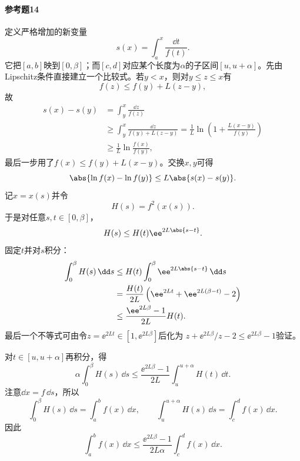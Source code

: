 \paragraph{参考题14}
\begin{xsolution}
定义严格增加的新变量
\[
 s(x)=\int_a^x\frac{\dd t}{f(t)}.
\]
它把$[a,b]$映到$[0,\beta]$；而$[c,d]$对应某个长度为$\alpha$的子区间$[u,u+\alpha]$。先由Lipschitz条件直接建立一个比较式。若$y<x$，则对$y\le z\le x$有
\[
 f(z)\le f(y)+L(z-y),
\]
故
\begin{align*}
 s(x)-s(y)
 &=\int_y^x\frac{\dd z}{f(z)}\\
 &\ge\int_y^x\frac{\dd z}{f(y)+L(z-y)}
 =\frac1L\ln\left(1+\frac{L(x-y)}{f(y)}\right)\\
 &\ge\frac1L\ln\frac{f(x)}{f(y)},
\end{align*}
最后一步用了$f(x)\le f(y)+L(x-y)$。交换$x,y$可得
\[
 \abs{\ln f(x)-\ln f(y)}\le L\abs{s(x)-s(y)}.
\]
记$x=x(s)$并令
\[
 H(s)=f^2(x(s)).
\]
于是对任意$s,t\in[0,\beta]$，
\[
 H(s)\le H(t)\ee^{2L\abs{s-t}}.
\]
固定$t$并对$s$积分：
\begin{align*}
\int_0^\beta H(s)\,\dd s
&\le H(t)\int_0^\beta\ee^{2L\abs{s-t}}\,\dd s\\
&=\frac{H(t)}{2L}\left(
 \ee^{2Lt}+\ee^{2L(\beta-t)}-2
\right)\\
&\le\frac{\ee^{2L\beta}-1}{2L}H(t).
\end{align*}
最后一个不等式可由令$z=\ee^{2Lt}\in[1,\ee^{2L\beta}]$后化为
$z+\ee^{2L\beta}/z-2\le\ee^{2L\beta}-1$验证。

对$t\in[u,u+\alpha]$再积分，得
\[
 \alpha\int_0^\beta H(s)\,\dd s
 \le\frac{\ee^{2L\beta}-1}{2L}
 \int_u^{u+\alpha}H(t)\,\dd t.
\]
注意$\dd x=f\,\dd s$，所以
\[
 \int_0^\beta H(s)\,\dd s=\int_a^bf(x)\,\dd x,
 \qquad
 \int_u^{u+\alpha}H(s)\,\dd s=\int_c^df(x)\,\dd x.
\]
因此
\[
 \boxed{
 \int_a^bf(x)\,\dd x
 \le\frac{\ee^{2L\beta}-1}{2L\alpha}
 \int_c^df(x)\,\dd x}.
\]
\end{xsolution}

